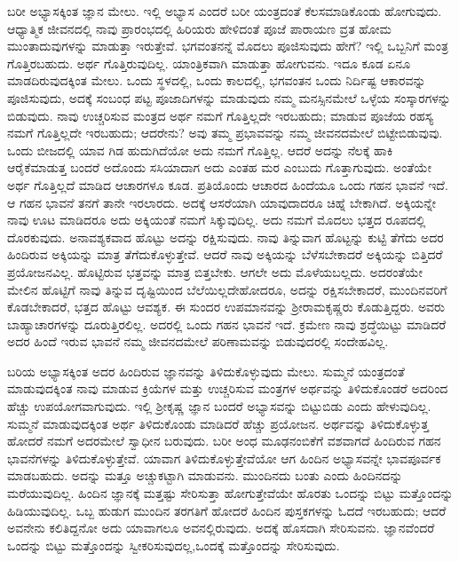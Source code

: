 ಬರೀ ಅಭ್ಯಾಸಕ್ಕಿಂತ ಜ್ಞಾನ ಮೇಲು. ಇಲ್ಲಿ ಅಭ್ಯಾಸ ಎಂದರೆ ಬರೀ ಯಂತ್ರದಂತೆ ಕೆಲಸಮಾಡಿಕೊಂಡು ಹೋಗುವುದು. ಆಧ್ಯಾತ್ಮಿಕ ಜೀವನದಲ್ಲಿ ನಾವು ಪ್ರಾರಂಭದಲ್ಲಿ ಹಿರಿಯರು ಹೇಳಿದಂತೆ ಪೂಜೆ ಪಾರಾಯಣ ವ್ರತ ಹೋಮ ಮುಂತಾದುವುಗಳನ್ನು ಮಾಡುತ್ತಾ ಇರುತ್ತೇವೆ. ಭಗವಂತನನ್ನೆ ಮೊದಲು ಪೂಜಿಸುವುದು ಹೇಗೆ? ಇಲ್ಲಿ ಒಬ್ಬನಿಗೆ ಮಂತ್ರ ಗೊತ್ತಿರಬಹುದು. ಅರ್ಥ ಗೊತ್ತಿರುವುದಿಲ್ಲ. ಯಾಂತ್ರಿಕವಾಗಿ ಮಾಡುತ್ತಾ ಹೋಗುವನು. ಇದೂ ಕೂಡ ಏನೂ ಮಾಡದಿರುವುದಕ್ಕಿಂತ ಮೇಲು. ಒಂದು ಸ್ಥಳದಲ್ಲಿ, ಒಂದು ಕಾಲದಲ್ಲಿ, ಭಗವಂತನ ಒಂದು ನಿರ್ದಿಷ್ಟ ಆಕಾರವನ್ನು ಪೂಜಿಸುವುದು, ಅದಕ್ಕೆ ಸಂಬಂಧ ಪಟ್ಟ ಪೂಜಾದಿಗಳನ್ನು ಮಾಡುವುದು ನಮ್ಮ ಮನಸ್ಸಿನಮೇಲೆ ಒಳ್ಳೆಯ ಸಂಸ್ಕಾರಗಳನ್ನು ಬಿಡುವುದು. ನಾವು ಉಚ್ಚರಿಸುವ ಮಂತ್ರದ ಅರ್ಥ ನಮಗೆ ಗೊತ್ತಿಲ್ಲದೇ ಇರಬಹುದು; ಮಾಡುವ ಪೂಜೆಯ ರಹಸ್ಯ ನಮಗೆ ಗೊತ್ತಿಲ್ಲದೇ ಇರಬಹುದು; ಆದರೇನು? ಅವು ತಮ್ಮ ಪ್ರಭಾವವನ್ನು ನಮ್ಮ ಜೀವನದಮೇಲೆ ಬಿಟ್ಟೇಬಿಡುವುವು. ಒಂದು ಬೀಜದಲ್ಲಿ ಯಾವ ಗಿಡ ಹುದುಗಿದೆಯೋ ಅದು ನಮಗೆ ಗೊತ್ತಿಲ್ಲ. ಆದರೆ ಅದನ್ನು ನೆಲಕ್ಕೆ ಹಾಕಿ ಆರೈಕೆಮಾಡುತ್ತ ಬಂದರೆ ಅದೊಂದು ಸಸಿಯಾದಾಗ ಅದು ಎಂತಹ ಮರ ಎಂಬುದು ಗೊತ್ತಾಗುವುದು. ಅಂತೆಯೇ ಅರ್ಥ ಗೊತ್ತಿಲ್ಲದೆ ಮಾಡಿದ ಆಚಾರಗಳೂ ಕೂಡ. ಪ್ರತಿಯೊಂದು ಆಚಾರದ ಹಿಂದೆಯೂ ಒಂದು ಗಹನ ಭಾವನೆ ಇದೆ. ಆ ಗಹನ ಭಾವನೆ ತನಗೆ ತಾನೇ ಇರಲಾರದು. ಅದಕ್ಕೆ ಆಸರೆಯಾಗಿ ಯಾವುದಾದರೂ ಚಿಹ್ನೆ ಬೇಕಾಗಿದೆ. ಅಕ್ಕಿಯನ್ನೇ ನಾವು ಊಟ ಮಾಡಿದರೂ ಅದು ಅಕ್ಕಿಯಂತೆ ನಮಗೆ ಸಿಕ್ಕುವುದಿಲ್ಲ. ಅದು ನಮಗೆ ಮೊದಲು ಭತ್ತದ ರೂಪದಲ್ಲಿ ದೊರಕುವುದು. ಅನಾವಶ್ಯಕವಾದ ಹೊಟ್ಟು ಅದನ್ನು ರಕ್ಷಿಸುವುದು. ನಾವು ತಿನ್ನುವಾಗ ಹೊಟ್ಟನ್ನು ಕುಟ್ಟಿ ತೆಗೆದು ಅದರ ಹಿಂದಿರುವ ಅಕ್ಕಿಯನ್ನು ಮಾತ್ರ ತೆಗೆದುಕೊಳ್ಳುತ್ತೇವೆ. ಆದರೆ ನಾವು ಅಕ್ಕಿಯನ್ನು ಬೆಳೆಸಬೇಕಾದರೆ ಅಕ್ಕಿಯನ್ನು ಬಿತ್ತಿದರೆ ಪ್ರಯೋಜನವಿಲ್ಲ. ಹೊಟ್ಟಿರುವ ಭತ್ತವನ್ನು ಮಾತ್ರ ಬಿತ್ತಬೇಕು. ಆಗಲೇ ಅದು ಮೊಳೆಯಬಲ್ಲದು. ಅದರಂತೆಯೇ ಮೇಲಿನ ಹೊಟ್ಟಿಗೆ ನಾವು ತಿನ್ನುವ ದೃಷ್ಟಿಯಿಂದ ಬೆಲೆಯಿಲ್ಲದೇಹೋದರೂ, ಅದನ್ನು ರಕ್ಷಿಸಬೇಕಾದರೆ, ಮುಂದಿನವರಿಗೆ ಕೊಡಬೇಕಾದರೆ, ಭತ್ತದ ಹೊಟ್ಟು ಆವಶ್ಯಕ. ಈ ಸುಂದರ ಉಪಮಾನವನ್ನು ಶ‍್ರೀರಾಮಕೃಷ್ಣರು ಕೊಡುತ್ತಿದ್ದರು. ಅವರು ಬಾಹ್ಯಾಚಾರಗಳನ್ನು ದೂರುತ್ತಿರಲಿಲ್ಲ. ಅದರಲ್ಲಿ ಒಂದು ಗಹನ ಭಾವನೆ ಇದೆ. ಕ್ರಮೇಣ ನಾವು ಶ್ರದ್ಧೆಯಿಟ್ಟು ಮಾಡಿದರೆ ಅದರ ಹಿಂದೆ ಇರುವ ಭಾವನೆ ನಮ್ಮ ಜೀವನದಮೇಲೆ ಪರಿಣಾಮವನ್ನು ಬಿಡುವುದರಲ್ಲಿ ಸಂದೇಹವಿಲ್ಲ.

ಬರಿಯ ಅಭ್ಯಾಸಕ್ಕಿಂತ ಅದರ ಹಿಂದಿರುವ ಜ್ಞಾನವನ್ನು ತಿಳಿದುಕೊಳ್ಳುವುದು ಮೇಲು. ಸುಮ್ಮನೆ ಯಂತ್ರದಂತೆ ಮಾಡುವುದಕ್ಕಿಂತ ನಾವು ಮಾಡುವ ಕ್ರಿಯೆಗಳ ಮತ್ತು ಉಚ್ಚರಿಸುವ ಮಂತ್ರಗಳ ಅರ್ಥವನ್ನು ತಿಳಿದುಕೊಂಡರೆ ಅದರಿಂದ ಹೆಚ್ಚು ಉಪಯೋಗವಾಗುವುದು. ಇಲ್ಲಿ ಶ‍್ರೀಕೃಷ್ಣ ಜ್ಞಾನ ಬಂದರೆ ಅಭ್ಯಾಸವನ್ನು ಬಿಟ್ಟುಬಿಡು ಎಂದು ಹೇಳುವುದಿಲ್ಲ. ಸುಮ್ಮನೆ ಮಾಡುವುದಕ್ಕಿಂತ ಅರ್ಥ ತಿಳಿದುಕೊಂಡು ಮಾಡಿದರೆ ಹೆಚ್ಚು ಪ್ರಯೋಜನ. ಅರ್ಥವನ್ನು ತಿಳಿದುಕೊಳ್ಳುತ್ತ ಹೋದರೆ ನಮಗೆ ಅದರಮೇಲೆ ಸ್ವಾಧೀನ ಬರುವುದು. ಬರೀ ಅಂಧ ಮೂಢನಂಬಿಕೆಗೆ ವಶವಾಗದೆ ಹಿಂದಿರುವ ಗಹನ ಭಾವನೆಗಳನ್ನು ತಿಳಿದುಕೊಳ್ಳುತ್ತೇವೆ. ಯಾವಾಗ ತಿಳಿದುಕೊಳ್ಳುತ್ತೇವೆಯೋ ಆಗ ಹಿಂದಿನ ಅಭ್ಯಾಸವನ್ನೇ ಭಾವಪೂರ್ವಕ ಮಾಡಬಹುದು. ಅದನ್ನು ಮತ್ತೂ ಅಚ್ಚುಕಟ್ಟಾಗಿ ಮಾಡುವನು. ಮುಂದಿನದು ಬಂತು ಎಂದು ಹಿಂದಿನದನ್ನು ಮರೆಯುವುದಿಲ್ಲ. ಹಿಂದಿನ ಜ್ಞಾನಕ್ಕೆ ಮತ್ತಷ್ಟು ಸೇರಿಸುತ್ತಾ ಹೋಗುತ್ತೇವೆಯೇ ಹೊರತು ಒಂದನ್ನು ಬಿಟ್ಟು ಮತ್ತೊಂದನ್ನು ಹಿಡಿಯುವುದಿಲ್ಲ. ಒಬ್ಬ ಹುಡುಗ ಮುಂದಿನ ತರಗತಿಗೆ ಹೋದರೆ ಹಿಂದಿನ ಪುಸ್ತಕಗಳನ್ನು ಓದದೆ ಇರಬಹುದು; ಆದರೆ ಅವನೇನು ಕಲಿತಿದ್ದನೋ ಅದು ಯಾವಾಗಲೂ ಅವನಲ್ಲಿರುವುದು. ಅದಕ್ಕೆ ಹೊಸದಾಗಿ ಸೇರಿಸುವನು. ಜ್ಞಾನವೆಂದರೆ ಒಂದನ್ನು ಬಿಟ್ಟು ಮತ್ತೊಂದನ್ನು ಸ್ವೀಕರಿಸುವುದಲ್ಲ,\break ಒಂದಕ್ಕೆ ಮತ್ತೊಂದನ್ನು ಸೇರಿಸುವುದು.

